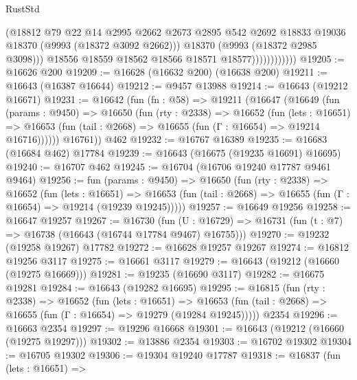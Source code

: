 \begin{lexlean}{RustStd}
\begin{coremodule}
                              (@18812
                                @79
                                @22
                                @14
                                @2995
                                @2662
                                @2673
                                @2895
                                @542
                                @2692
                                @18833
                                @19036
                                @18370
                                (@9993 (@18372 @3092 @2662)))
                              @18370
                              (@9993 (@18372 @2985 @3098)))
                            @18556
                            @18559
                            @18562
                            @18566
                            @18571
                            @18577))))))))))))
@19205 := @16626 @200
@19209 := @16628 (@16632 @200) (@16638 @200)
@19211 := @16643 (@16387 @16644)
@19212 := @9457 @13988
@19214 := @16643 (@19212 @16671)
@19231 := @16642
    (fun (fn : @58) =>
    @19211
      (@16647
        (@16649
          (fun (params : @9450) =>
          @16650
            (fun (rty : @2338) =>
            @16652
              (fun (lets : @16651) =>
              @16653 (fun (tail : @2668) => @16655 (fun (Γ : @16654) => @19214 @16716))))))
        @16761))
    @462
@19232 := @16767 @16389
@19235 := @16683 (@16684 @462) @17784
@19239 := @16643 (@16675 (@19235 @16691) @16695)
@19240 := @16707 @462
@19245 := @16704 (@16706 @19240 @17787 @9461 @9464)
@19256 := fun (params : @9450) =>
  @16650
    (fun (rty : @2338) =>
    @16652
      (fun (lets : @16651) =>
      @16653 (fun (tail : @2668) => @16655 (fun (Γ : @16654) => @19214 (@19239 @19245)))))
@19257 := @16649 @19256
@19258 := @16647 @19257
@19267 := @16730
    (fun (U : @16729) => @16731 (fun (t : @7) => @16738 (@16643 (@16744 @17784 @9467) @16755)))
@19270 := @19232 (@19258 @19267) @17782
@19272 := @16628 @19257 @19267
@19274 := @16812 @19256 @3117
@19275 := @16661 @3117
@19279 := @16643 (@19212 (@16660 (@19275 @16669)))
@19281 := @19235 (@16690 @3117)
@19282 := @16675 @19281
@19284 := @16643 (@19282 @16695)
@19295 := @16815
    (fun (rty : @2338) =>
    @16652
      (fun (lets : @16651) =>
      @16653 (fun (tail : @2668) => @16655 (fun (Γ : @16654) => @19279 (@19284 @19245)))))
    @2354
@19296 := @16663 @2354
@19297 := @19296 @16668
@19301 := @16643 (@19212 (@16660 (@19275 @19297)))
@19302 := @13886 @2354
@19303 := @16702 @19302
@19304 := @16705 @19302
@19306 := @19304 @19240 @17787
@19318 := @16837
    (fun (lets : @16651) =>

\end{coremodule}
\end{lexlean}
